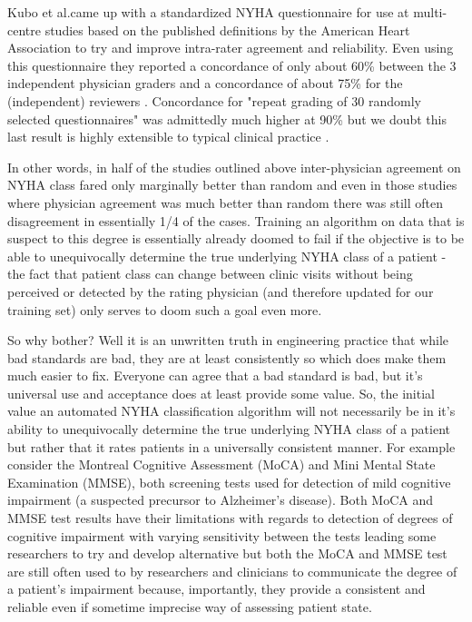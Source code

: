 \documentclass[]{article}
\begin{document}
Kubo et al.\@ came up with a standardized NYHA questionnaire for use at multi-centre studies based on the published definitions by the American Heart Association to try and improve intra-rater agreement and reliability\cite{Kubo2004}. Even using this questionnaire they reported a concordance of only about 60\% between the 3 independent physician graders and a concordance of about 75\% for the (independent) reviewers \cite{Kubo2004}. Concordance for "repeat grading of 30 randomly selected questionnaires" was admittedly much higher at 90\% but we doubt this last result is highly extensible to typical clinical practice \cite{Kubo2004}. 

In other words, in half of the studies outlined above inter-physician agreement on NYHA class fared only marginally better than random and even in those studies where physician agreement was much better than random there was still often disagreement in essentially 1/4 of the cases. Training an algorithm on data that is suspect to this degree is essentially already doomed to fail if the objective is to be able to unequivocally determine the true underlying NYHA class of a patient - the fact that patient class can change between clinic visits without being perceived or detected by the rating physician (and therefore updated for our training set) only serves to doom such a goal even more.

So why bother? Well it is an unwritten truth in engineering practice that while bad standards are bad, they are at least consistently so which does make them much easier to fix. Everyone can agree that a bad standard is bad, but it's universal use and acceptance does at least provide some value. So, the initial value an automated NYHA classification algorithm will not necessarily be in it's ability to unequivocally determine the true underlying NYHA class of a patient but rather that it rates patients in a universally consistent manner. For example consider the Montreal Cognitive Assessment (MoCA) and Mini Mental State Examination (MMSE), both screening tests used for detection of mild cognitive impairment (a suspected precursor to Alzheimer's disease)\cite{Nasreddine2005}. Both MoCA and MMSE test results have their limitations with regards to detection of degrees of cognitive impairment with varying sensitivity between the tests leading some researchers to try and develop alternative but both the MoCA and MMSE test are still often used to by researchers and clinicians to communicate the degree of a patient's impairment because, importantly, they provide a consistent and reliable even if sometime imprecise way of assessing patient state\cite{Nasreddine2005,White2016,White2016a}. 
\end{document}
